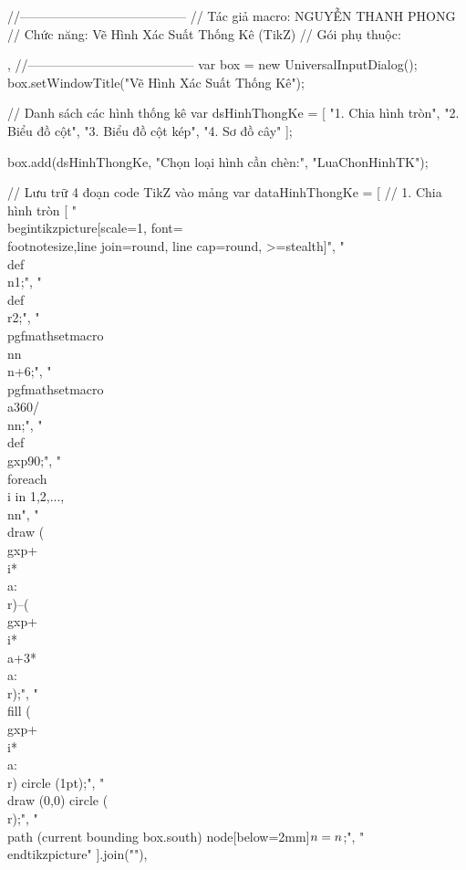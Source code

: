 //---------------------------------------
// Tác giả macro: NGUYỄN THANH PHONG
// Chức năng: Vẽ Hình Xác Suất Thống Kê (TikZ)
// Gói phụ thuộc: \usepackage{tikz}, \usetikzlibrary{patterns, shadows, arrows.meta}
//---------------------------------------
var box = new UniversalInputDialog();
box.setWindowTitle("Vẽ Hình Xác Suất Thống Kê");

// Danh sách các hình thống kê
var dsHinhThongKe = [
"1. Chia hình tròn",
"2. Biểu đồ cột",
"3. Biểu đồ cột kép",
"4. Sơ đồ cây"
];

box.add(dsHinhThongKe, "Chọn loại hình cần chèn:", "LuaChonHinhTK");

// Lưu trữ 4 đoạn code TikZ vào mảng
var dataHinhThongKe = [
// 1. Chia hình tròn
[
"\\begin{tikzpicture}[scale=1, font=\\footnotesize,line join=round, line cap=round, >=stealth]",
"\t\\def\\n{1};",
"\t\\def\\r{2};",
"\t\\pgfmathsetmacro\\nn{\\n+6};",
"\t\\pgfmathsetmacro\\a{360/\\nn};",
"\t\\def\\gxp{90};",
"\t\\foreach \\i in {1,2,...,\\nn}",
"\t{\\draw ({\\gxp+\\i*\\a}:\\r)--({\\gxp+\\i*\\a+3*\\a}:\\r);",
	"\t\t\\fill ({\\gxp+\\i*\\a}:\\r) circle (1pt);}",
"\t\\draw (0,0) circle (\\r);",
"\t\\path (current bounding box.south) node[below=2mm]{$n=\\n$};",
"\\end{tikzpicture}"
].join("\n"),

